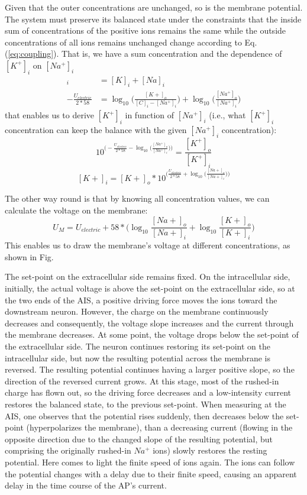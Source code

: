 Given that the outer concentrations are unchanged, so is the membrane potential. The system must preserve its balanced state under the constraints that the inside sum of concentrations of the positive ions remains the same while the outside concentrations of all ions remains unchanged
change according to Eq.(\ref{eq:coupling}). That is, we have a sum concentration and the dependence of $[K^+]_i$ on $[Na^+]_i$
\begin{align}
 [C]_i&=[K]_i+[Na]_i\\
 -\frac{U_{electric}}{2*58} &= \log_{10}\biggl( \frac{[K+]_o}{[C]_i-[Na^+]_i}\biggr) + \log_{10}\biggl( \frac{[Na^+]_o}{[Na^+]_i} \biggr)
 \end{align}
\noindent that enables us to derive $[K^+]_i$ in function of $[Na^+]_i$ (i.e., what $[K^+]_i$ concentration can keep the balance with the given $[Na^+]_i$ concentration):
\[
10^{\biggl(-\frac{U_{electric}}{2*58} - \log_{10}\biggl( \frac{[Na^+]_o}{[Na^+]_i} \biggr)\biggr)} =  \frac{[K^+]_o}{[K^+]_i}
\]
\noindent
\[
[K+]_i = {[K+]_o}*10^{\biggl(\frac{U_{electric}}{2*58} + \log_{10}\biggl( \frac{[Na+]_o}{[Na+]_i} \biggr)\biggr)}
\]

The other way round is that by knowing all concentration values, we can calculate the voltage on the membrane:
\[
U_{M} = U_{electric} + 58*\biggl(\log_{10}\frac{[Na+]_o}{[Na+]_i}+\log_{10}\frac{[K+]_o}{[K+]_i}\biggr)
\]
This enables us to draw the membrane's voltage at different 
concentrations, as shown in Fig.


The set-point on the extracellular side remains fixed.
On the intracellular side, initially, the actual voltage 
is above the set-point on the extracellular side, so at the two ends of the 
AIS,
 a positive driving force moves the ions toward the downstream neuron. However, the charge on the membrane continuously decreases  and consequently, the voltage slope increases and the current through the membrane decreases. At some point, 
the voltage drops below the set-point of the extracellular side. The neuron continues restoring 
its set-point on the intracellular side, but now the 
resulting potential across the membrane is reversed. The resulting potential continues having a larger positive slope, 
so the direction of the reversed current grows.
At this stage, most of the rushed-in charge has flown out,
so the driving force decreases and a low-intensity current
restores the balanced state, to the previous set-point.
When measuring at the 
\gls{AIS},
 one observes that the
potential rises suddenly, then decreases below the set-point (hyperpolarizes the membrane), than a decreasing current (flowing in the opposite direction due to the changed slope of the resulting potential,
but comprising the originally rushed-in $Na^+$ ions) slowly restores the resting potential.
Here comes to light the finite speed of ions again. 
The ions can follow the potential changes with a delay
due to their finite speed, causing an apparent delay in the time course of the
\gls{AP}'s current.

